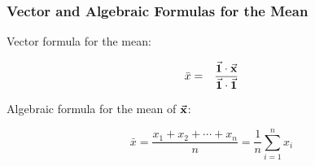 \documentclass{beamer}
\begin{document}
\begin{frame}
  \frametitle{Vector and Algebraic Formulas for the Mean}


Vector formula for the mean:

  \begin{eqnarray*}
   \bar{x} &=& \frac{\vec{\mathbf{1}} \cdot \vec{\mathbf{x}}}{\vec{\mathbf{1}} \cdot \vec{\mathbf{1}}} \\
  \end{eqnarray*}

  \medskip

Algebraic formula for the mean of $\vec{\mathbf{x}}$:

\begin{equation*}
 \bar{x} = \frac{x_1 + x_2 + \cdots + x_n}{n} = \frac{1}{n}\sum_{i=1}^{n} x_i
\end{equation*}

\medskip




\end{frame}










\end{document}
